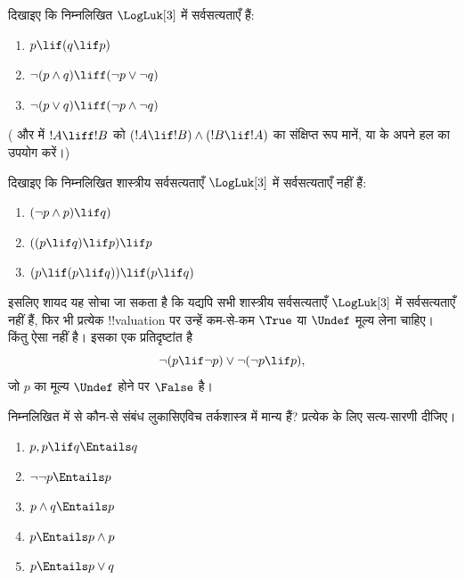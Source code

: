 \documentclass[../../../include/open-logic-section]{subfiles}
\begin{document}
\begin{prob}
  दिखाइए कि निम्नलिखित $\LogLuk[3]$ में सर्वसत्यताएँ हैं:
  \begin{enumerate}
    \item $p \lif (q \lif p)$
    \item\label{mvl:thr:luk:prob:luk-taut-2} $\lnot(p \land q) \liff (\lnot p \lor \lnot q)$
    \item\label{mvl:thr:luk:prob:luk-taut-3} $\lnot(p \lor q) \liff (\lnot p \land \lnot q)$
  \end{enumerate}
  ( और
   में $!A \liff !B$ को
  $(!A \lif !B) \land (!B \lif !A)$ का संक्षिप्त रूप मानें, या
   के अपने हल का उपयोग करें।)
\end{prob}

\begin{prob}
  दिखाइए कि निम्नलिखित शास्त्रीय सर्वसत्यताएँ $\LogLuk[3]$ में
  सर्वसत्यताएँ नहीं हैं:
  \begin{enumerate}
    \item $(\lnot p \land p) \lif q)$
    \item $((p \lif q) \lif p) \lif p$
    \item $(p \lif (p \lif q)) \lif (p \lif q)$
  \end{enumerate}
\end{prob}

इसलिए शायद यह सोचा जा सकता है कि यद्यपि सभी शास्त्रीय सर्वसत्यताएँ
$\LogLuk[3]$ में सर्वसत्यताएँ नहीं हैं, फिर भी प्रत्येक !!{valuation} पर
उन्हें कम-से-कम $\True$ या $\Undef$ मूल्य लेना चाहिए। किंतु ऐसा नहीं है।
इसका एक प्रतिदृष्टांत है
\[
  \lnot(p \lif \lnot p) \lor \lnot(\lnot p \lif p),
\]
जो $p$ का मूल्य $\Undef$ होने पर $\False$ है।

\begin{prob}
  निम्नलिखित में से कौन-से संबंध लुकासिएविच तर्कशास्त्र में मान्य हैं?
  प्रत्येक के लिए सत्य-सारणी दीजिए।
  \begin{enumerate}
    \item $p, p \lif q \Entails q$
    \item $\lnot\lnot p \Entails p$
    \item $p \land q \Entails p$
    \item $p \Entails p \land p$
    \item $p \Entails p \lor q$
  \end{enumerate}
\end{prob}
\end{document}

